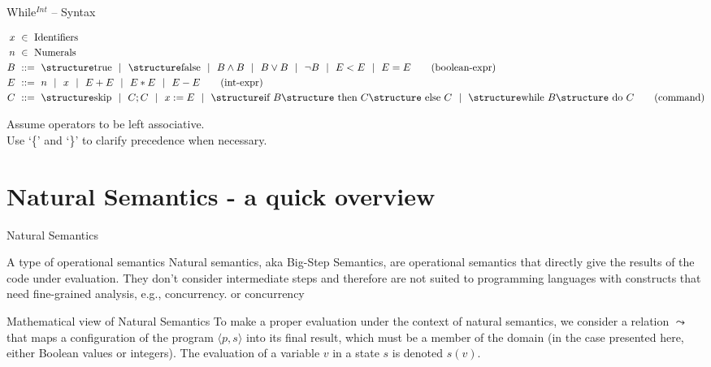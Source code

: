 \documentclass[aspectratio=169]{beamer}
\begin{document}
\begin{slide}{While$^{Int}$ -- Syntax}
\small

\begin{align*}
  x &~\in~ \text{Identifiers}
  \\
  n &~\in~ \text{Numerals}
  \\
  B &~::=~ \kw{true} ~~|~~ \kw{false}  ~~|~~ B \land B ~~|~~ B \lor B ~~|~~ \lnot B ~~|~~ E<E ~~|~~ E=E
  \tag{boolean-expr}\\
  E &~::=~ n ~~|~~ x ~~|~~ E+E ~~|~~ E*E ~~|~~ E-E
  \tag{int-expr}\\
  C &~::=~ \kw {skip} ~~|~~ C;C ~~|~~ x:=E
 ~~|~~  \kw{if } B \kw{ then } C\kw{ else }C ~~|~~  \kw{while }B\kw{ do }C
  \tag{command}
\end{align*}

Assume operators to be left associative.
\\Use `\{' and `\}' to clarify precedence when necessary.

\end{slide}

\section{Natural Semantics - a quick overview}

\begin{slide}{Natural Semantics}
\begin{block}{A type of operational semantics}
Natural semantics, aka Big-Step Semantics, are operational semantics that directly give the results of the code under evaluation. They don't consider intermediate steps and therefore are not suited to programming languages with constructs that need fine-grained analysis, e.g., concurrency.
or concurrency  
\end{block}
\begin{block}{Mathematical view of Natural Semantics}
To make a proper evaluation under the context of natural semantics, we consider a relation $\leadsto$ that maps a configuration of the program $\langle p, s \rangle$ into its final result, which must be a member of the domain (in the case presented here, either Boolean values or integers). The evaluation of a variable $v$ in a state $s$ is denoted $s(v)$.  
\end{block}
\end{slide}
\end{document}
